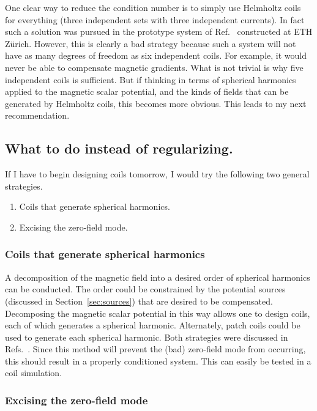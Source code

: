 One clear way to reduce the condition number is to simply use Helmholtz coils for everything (three independent sets with three independent currents).  In fact such a solution was pursued in the prototype system of Ref.~\cite{rawlik} constructed at ETH Z\"urich. However, this is clearly a bad strategy because such a system will not have as many degrees of freedom as six independent coils.  For example, it would never be able to compensate magnetic gradients. What is not trivial is why five independent coils is sufficient.  But if thinking in terms of spherical harmonics applied to the magnetic scalar potential, and the kinds of fields that can be generated by Helmholtz coils, this becomes more obvious.  This leads to my next recommendation.


\subsection{What to do instead of regularizing.\label{sec:spherical}}

If I have to begin designing coils tomorrow, I would try the following two general strategies.
\begin{enumerate}
    \item Coils that generate spherical harmonics.
    \item Excising the zero-field mode.
\end{enumerate}

\subsubsection{Coils that generate spherical harmonics}

A decomposition of the magnetic field into a desired order of spherical harmonics can be conducted. The order could be constrained by the potential sources (discussed in Section~\ref{sec:sources}) that are desired to be compensated.  Decomposing the magnetic scalar potential in this way allows one to design coils, each of which generates a spherical harmonic.  Alternately, patch coils could be used to generate each spherical harmonic. Both strategies were discussed in Refs.~\cite{rawlik,rawlik_paper_coil}. Since this method will prevent the (bad) zero-field mode from occurring, this should result in a properly conditioned system.  This can easily be tested in a coil simulation.

\subsubsection{Excising the zero-field mode}

